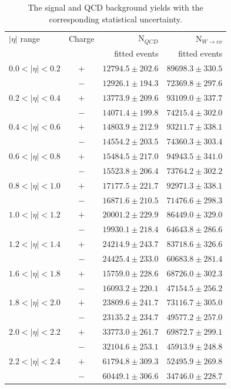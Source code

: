 \begin{table}[htbp]
 \begin{center}
 \begin{tabular}{lcrr}
\toprule
$|\eta|$ range &  Charge &  N$_{QCD}$     & N$_{W\rightarrow e \nu}$  \\
               &         & fitted events & fitted events            \\
\midrule
$0.0<| \eta |<0.2$ &  $+$ & $12794.5 \pm 202.6$ &$89698.3\pm330.5$ \\
                   &  $-$ & $12926.1 \pm 194.3$ &$72369.8\pm297.6$ \\ 
$0.2<| \eta |<0.4$ &  $+$ & $13773.9 \pm 209.6$ &$93109.0\pm337.7$ \\
                   &  $-$ & $14071.4 \pm 199.8$ &$74215.4\pm302.0$ \\ 
$0.4<| \eta |<0.6$ &  $+$ & $14803.9 \pm 212.9$ &$93211.7\pm338.1$ \\
                   &  $-$ & $14554.2 \pm 203.5$ &$74360.3\pm303.4$ \\ 
$0.6<| \eta |<0.8$ &  $+$ & $15484.5 \pm 217.0$ &$94943.5\pm341.0$ \\
                   &  $-$ & $15523.8 \pm 206.4$ &$73764.2\pm302.2$ \\ 
$0.8<| \eta |<1.0$ &  $+$ & $17177.5 \pm 221.7$ &$92971.3\pm338.1$ \\
                   &  $-$ & $16871.6 \pm 210.5$ &$71476.6\pm298.3$ \\ 
$1.0<| \eta |<1.2$ &  $+$ & $20001.2 \pm 229.9$ &$86449.0\pm329.0$ \\
                   &  $-$ & $19930.1 \pm 218.4$ &$64643.8\pm286.6$ \\ 
$1.2<| \eta |<1.4$ &  $+$ & $24214.9 \pm 243.7$ &$83718.6\pm326.6$ \\
                   &  $-$ & $24425.4 \pm 233.0$ &$60683.8\pm281.4$ \\ 
$1.6<| \eta |<1.8$ &  $+$ & $15759.0 \pm 228.6$ &$68726.0\pm302.3$ \\
                   &  $-$ & $16093.2 \pm 220.1$ &$47154.5\pm256.2$ \\ 
$1.8<| \eta |<2.0$ &  $+$ & $23809.6 \pm 241.7$ &$73116.7\pm305.0$ \\
                   &  $-$ & $23135.2 \pm 234.7$ &$49577.2\pm257.0$ \\ 
$2.0<| \eta |<2.2$ &  $+$ & $33773.0 \pm 261.7$ &$69872.7\pm299.1$ \\
                   &  $-$ & $32104.6 \pm 253.1$ &$45913.9\pm248.8$ \\ 
$2.2<| \eta |<2.4$ &  $+$ & $61794.8 \pm 309.3$ &$52495.9\pm269.8$ \\
                   &  $-$ & $60449.1 \pm 306.6$ &$34746.0\pm228.7$ \\ 
\bottomrule
 \end{tabular}
 \caption[The signal and {QCD} background yields with the corresponding
statistical uncertainty]{\label{tab:updatedsigyield} The signal and {QCD}
background yields with the corresponding statistical
uncertainty\cite{bendavid2011electron}.}
 \end{center}
\end{table}

